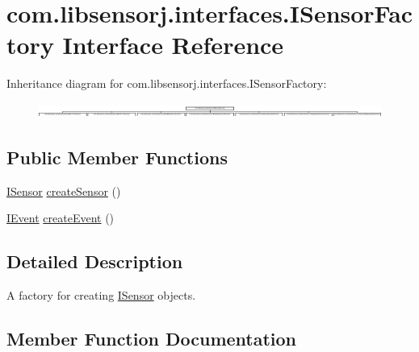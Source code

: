 \hypertarget{interfacecom_1_1libsensorj_1_1interfaces_1_1ISensorFactory}{}\section{com.\+libsensorj.\+interfaces.\+I\+Sensor\+Factory Interface Reference}
\label{interfacecom_1_1libsensorj_1_1interfaces_1_1ISensorFactory}
Inheritance diagram for com.\+libsensorj.\+interfaces.\+I\+Sensor\+Factory\+:\begin{figure}[H]
\begin{center}
\leavevmode
\includegraphics[height=0.501792cm]{interfacecom_1_1libsensorj_1_1interfaces_1_1ISensorFactory}
\end{center}
\end{figure}
\subsection*{Public Member Functions}
\begin{DoxyCompactItemize}
\item 
\hyperlink{interfacecom_1_1libsensorj_1_1interfaces_1_1ISensor}{I\+Sensor} \hyperlink{interfacecom_1_1libsensorj_1_1interfaces_1_1ISensorFactory_ac14c6d566c37c6a79c6db1e85634f25d}{create\+Sensor} ()
\item 
\hyperlink{classcom_1_1libsensorj_1_1interfaces_1_1IEvent}{I\+Event} \hyperlink{interfacecom_1_1libsensorj_1_1interfaces_1_1ISensorFactory_a2b074d01287a4e64677097255ba9e768}{create\+Event} ()
\end{DoxyCompactItemize}


\subsection{Detailed Description}
A factory for creating \hyperlink{interfacecom_1_1libsensorj_1_1interfaces_1_1ISensor}{I\+Sensor} objects. 

\subsection{Member Function Documentation}
\hypertarget{interfacecom_1_1libsensorj_1_1interfaces_1_1ISensorFactory_a2b074d01287a4e64677097255ba9e768}{}

